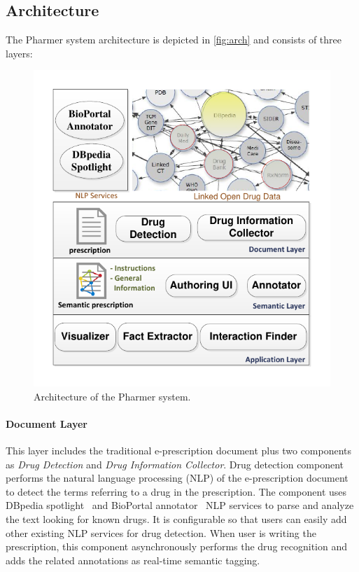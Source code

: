 \documentclass[conference]{IEEEtran}
\begin{document}
\subsection{Architecture}

The Pharmer system architecture is depicted in \autoref{fig:arch} and consists of three layers:

\begin{figure}[tb]
	\centering
		\includegraphics[width=1\columnwidth]{../images/architecture.pdf}
	\caption{Architecture of the Pharmer system.}
	\label{fig:arch}
\end{figure}

\paragraph{Document Layer} This layer includes the traditional e-prescription document plus two components as \emph{Drug Detection} and \emph{Drug Information Collector}.
Drug detection component performs the natural language processing (NLP) of the e-prescription document to detect the terms referring to a drug in the prescription.
The component uses DBpedia spotlight~\cite{dbspotlight} and BioPortal annotator~\cite{bioportal} NLP services to parse and analyze the text looking for known drugs.
It is configurable so that users can easily add other existing NLP services for drug detection.
When user is writing the prescription, this component asynchronously performs the drug recognition and adds the related annotations as real-time semantic tagging.
\end{document}
